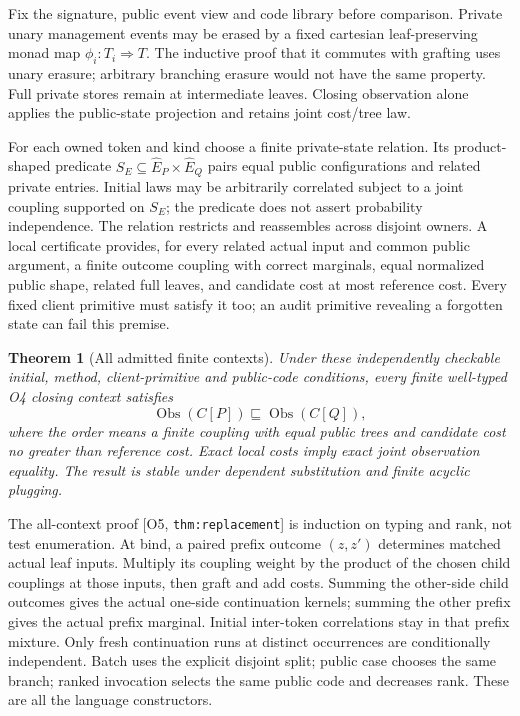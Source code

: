 \documentclass[11pt,a4paper]{article}
\newtheorem{theorem}{Theorem}[section]
\theoremstyle{definition}
\newcommand{\Obs}{\operatorname{Obs}}
\newcommand{\Addr}[2]{\textup{[#1, \texttt{#2}]}}
\begin{document}
Fix the signature, public event view and code library before comparison.
Private unary management events may be erased by a fixed cartesian
leaf-preserving monad map \(\phi_i:T_i\Rightarrow T\). The inductive
proof that it commutes with grafting uses unary erasure; arbitrary branching
erasure would not have the same property. Full private stores remain at
intermediate leaves. Closing observation alone applies the public-state
projection and retains joint cost/tree law.

For each owned token and kind choose a finite private-state relation.
Its product-shaped predicate \(S_E\subseteq\widehat E_P\times
\widehat E_Q\) pairs equal public configurations and related private
entries. Initial laws may be arbitrarily correlated subject to a joint
coupling supported on \(S_E\); the predicate does not assert probability
independence. The relation restricts and reassembles across disjoint owners.
A local certificate provides, for every related actual input and common
public argument, a finite outcome coupling with correct marginals,
equal normalized public shape, related full leaves, and candidate cost
at most reference cost. Every fixed client primitive must satisfy it too;
an audit primitive revealing a forgotten state can fail this premise.

\begin{theorem}[All admitted finite contexts]\label{thm:contextual}
Under these independently checkable initial, method, client-primitive
and public-code conditions, every finite well-typed O4 closing context
satisfies
\[
 \Obs(C[P])\sqsubseteq\Obs(C[Q]),
\]
where the order means a finite coupling with equal public trees and
candidate cost no greater than reference cost. Exact local costs imply
exact joint observation equality. The result is stable under dependent
substitution and finite acyclic plugging.
\end{theorem}
The all-context proof \Addr{O5}{thm:replacement} is induction on typing
and rank, not test enumeration. At bind, a paired prefix outcome
\((z,z')\) determines matched actual leaf inputs. Multiply its coupling
weight by the product of the chosen child couplings at those inputs,
then graft and add costs. Summing the other-side child outcomes gives
the actual one-side continuation kernels; summing the other prefix gives
the actual prefix marginal. Initial inter-token correlations stay in
that prefix mixture. Only fresh continuation runs at distinct occurrences
are conditionally independent. Batch uses the explicit disjoint split;
public case chooses the same branch; ranked invocation selects the same
public code and decreases rank. These are all the language constructors.
\end{document}
